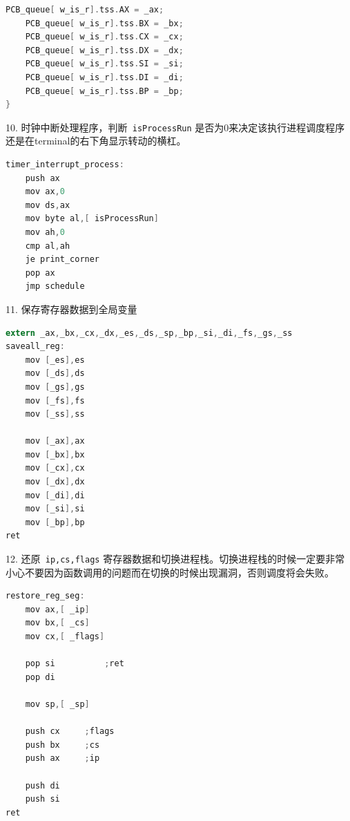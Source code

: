\documentclass[a4paper]{article}
\begin{document}
{{{\begin{lstlisting}[language={C}]
	PCB_queue[ w_is_r].tss.AX = _ax;
	PCB_queue[ w_is_r].tss.BX = _bx;
	PCB_queue[ w_is_r].tss.CX = _cx;
	PCB_queue[ w_is_r].tss.DX = _dx;
	PCB_queue[ w_is_r].tss.SI = _si;
	PCB_queue[ w_is_r].tss.DI = _di;
	PCB_queue[ w_is_r].tss.BP = _bp;
}
\end{lstlisting}}
10. 时钟中断处理程序，判断\verb| isProcessRun| 是否为0来决定该执行进程调度程序还是在terminal的右下角显示转动的横杠。

{\scriptsize \begin{lstlisting}[language={C}]
timer_interrupt_process:
	push ax
	mov ax,0
	mov ds,ax
	mov byte al,[ isProcessRun]
	mov ah,0
	cmp al,ah
	je print_corner
	pop ax
	jmp schedule
\end{lstlisting}}
11. 保存寄存器数据到全局变量
{\scriptsize \begin{lstlisting}[language={C}]
extern _ax,_bx,_cx,_dx,_es,_ds,_sp,_bp,_si,_di,_fs,_gs,_ss
saveall_reg:
	mov [_es],es
	mov [_ds],ds
	mov [_gs],gs
	mov [_fs],fs
	mov [_ss],ss

	mov [_ax],ax
	mov [_bx],bx
	mov [_cx],cx
	mov [_dx],dx
	mov [_di],di
	mov [_si],si
	mov [_bp],bp
ret
\end{lstlisting}}
12. 还原\verb| ip,cs,flags| 寄存器数据和切换进程栈。切换进程栈的时候一定要非常小心不要因为函数调用的问题而在切换的时候出现漏洞，否则调度将会失败。
{\scriptsize \begin{lstlisting}[language={C}]
	restore_reg_seg:
	mov ax,[ _ip]
	mov bx,[ _cs]
	mov cx,[ _flags]

	pop si			;ret
	pop di

	mov sp,[ _sp]

	push cx		;flags
	push bx		;cs
	push ax		;ip

	push di
	push si
ret

\end{lstlisting}}


}
}
\end{document}
